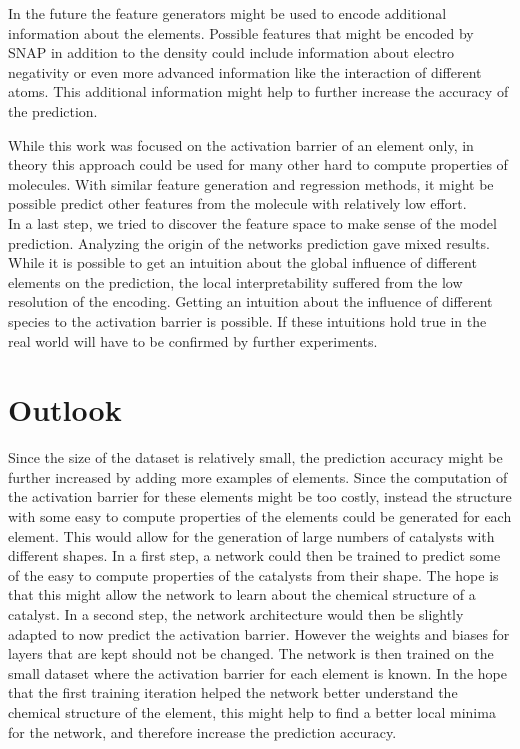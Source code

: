 In the future the feature generators might be used to encode additional information about the elements.
Possible features that might be encoded by SNAP in addition to the density could include information about 
electro negativity or even more advanced information like the interaction of different atoms.
This additional information might help to further increase the accuracy of the prediction.

While this work was focused on the activation barrier of an element only,
in theory this approach could be used for many other hard to compute properties of molecules.
With similar feature generation and regression methods, it might be possible 
predict other features from the molecule with relatively low effort.
\\

In a last step, we tried to discover the feature space to make sense of the model prediction.
Analyzing the origin of the networks prediction gave mixed results.
While it is possible to get an intuition about the global influence of different elements on
the prediction, the local interpretability suffered from the low resolution of the encoding.
Getting an intuition about the influence of different species to the activation barrier is possible.
If these intuitions hold true in the real world will have to be confirmed by further experiments.

\section{Outlook}

Since the size of the dataset is relatively small, the prediction accuracy might be further increased by 
adding more examples of elements.
Since the computation of the activation barrier for these elements might be too costly, instead the structure with some easy to compute 
properties of the elements could be generated for each element.
This would allow for the generation of large numbers of catalysts with different shapes.
In a first step, a network could then be trained to predict some of the easy to compute properties of the catalysts from their shape.
The hope is that this might allow the network to learn about the chemical structure of a catalyst.
In a second step, the network architecture would then be slightly adapted to now predict the activation barrier.
However the weights and biases for layers that are kept should not be changed.
The network is then trained on the small dataset where the activation barrier for each element is known.
In the hope that the first training iteration helped the network better understand the chemical structure of the element,
this might help to find a better local minima for the network, and therefore increase the prediction accuracy.
\\

